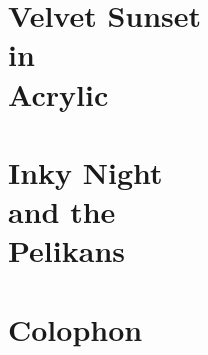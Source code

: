 \documentclass[12pt]{book}
\begin{document}
\chapter[Velvet Sunset in Acrylic]
{Velvet Sunset\\
in\\
Acrylic}
\lipsum[101-120]

\chapter[Inky Night and the Pelikans]
{Inky Night\\
and the\\
Pelikans}
\lipsum[121-140]

\backmatter
\appendix

\chapter{Colophon}
\thispagestyle{empty}
\lipsum[141-144]
\end{document}
